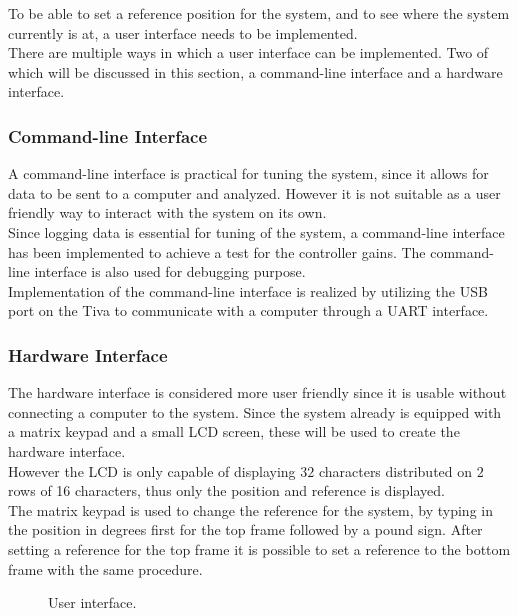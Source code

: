 \documentclass[../../../main]{subfiles}
\begin{document}
To be able to set a reference position for the system, and to see where the system currently is at, a user interface needs to be implemented.\\
There are multiple ways in which a user interface can be implemented.
Two of which will be discussed in this section, a command-line interface and a hardware interface.

\subsubsection{Command-line Interface}%
\label{ssub:command-line_interface}
A command-line interface is practical for tuning the system, since it allows for data to be sent to a computer and analyzed.
However it is not suitable as a user friendly way to interact with the system on its own.
\\
Since logging data is essential for tuning of the system, a command-line interface has been implemented to achieve a test for the controller gains.
The command-line interface is also used for debugging purpose.
\\
Implementation of the command-line interface is realized by utilizing the USB port on the Tiva to communicate with a computer through a UART interface.

\subsubsection{Hardware Interface}%
\label{ssub:hardware_interface}
The hardware interface is considered more user friendly since it is usable without connecting a computer to the system.
Since the system already is equipped with a matrix keypad and a small LCD screen, these will be used to create the hardware interface.
\\
However the LCD is only capable of displaying $32$ characters distributed on $2$ rows of 16 characters, thus only the position and reference is displayed.
\\
The matrix keypad is used to change the reference for the system, by typing in the position in degrees first for the top frame followed by a pound sign. 
After setting a reference for the top frame it is possible to set a reference to the bottom frame with the same procedure. 

\begin{figure}[H]
  \centering
  \def\svgwidth{\textwidth}
  
  \caption{User interface.}
  \label{fig:User_interface}
\end{figure}
\end{document}
